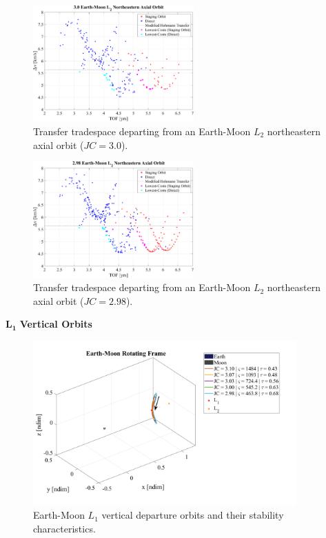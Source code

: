 \begin{figure}[ht]
    \centering
    \includegraphics[width=0.55\textwidth]{figures/TradeSpace_L2Axial_3_00.pdf}
    \caption{Transfer tradespace departing from an Earth-Moon $L_{2}$ northeastern axial orbit ($JC=3.0$).}
\end{figure}

\begin{figure}[ht]
    \centering
    \includegraphics[width=0.55\textwidth]{figures/TradeSpace_L2Axial_2_98.pdf}
    \caption{Transfer tradespace departing from an Earth-Moon $L_{2}$ northeastern axial orbit ($JC=2.98$).}
\end{figure}
\clearpage

$\pmb{L_{1}}$ \textbf{Vertical Orbits}
\begin{figure}[ht]
    \centering
    \includegraphics[width=0.9\textwidth]{figures/L1VerticalDepartureOrbits.pdf}
    \caption{Earth-Moon $L_{1}$ vertical departure orbits and their stability characteristics.}
\end{figure}

